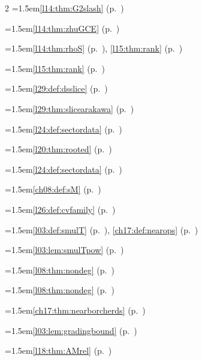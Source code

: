 \begin{multicols}{2}
\hangindent=1.5em\quad \ref{l14:thm:G2slash} (p.~\pageref{l14:thm:G2slash})\par
\hangindent=1.5em\quad \ref{l14:thm:zhuGCE} (p.~\pageref{l14:thm:zhuGCE})\par
\hangindent=1.5em\quad \ref{l14:thm:rhoS} (p.~\pageref{l14:thm:rhoS}), \ref{l15:thm:rank} (p.~\pageref{l15:thm:rank})\par
\hangindent=1.5em\quad \ref{l15:thm:rank} (p.~\pageref{l15:thm:rank})\par
\hangindent=1.5em\quad \ref{l29:def:dsslice} (p.~\pageref{l29:def:dsslice})\par
\hangindent=1.5em\quad \ref{l29:thm:slicearakawa} (p.~\pageref{l29:thm:slicearakawa})\par
\hangindent=1.5em\quad \ref{l24:def:sectordata} (p.~\pageref{l24:def:sectordata})\par
\hangindent=1.5em\quad \ref{l20:thm:rooted} (p.~\pageref{l20:thm:rooted})\par
\hangindent=1.5em\quad \ref{l24:def:sectordata} (p.~\pageref{l24:def:sectordata})\par
\hangindent=1.5em\quad \ref{ch08:def:sM} (p.~\pageref{ch08:def:sM})\par
\hangindent=1.5em\quad \ref{l26:def:cvfamily} (p.~\pageref{l26:def:cvfamily})\par
\hangindent=1.5em\quad \ref{l03:def:smulT} (p.~\pageref{l03:def:smulT}), \ref{ch17:def:nearops} (p.~\pageref{ch17:def:nearops})\par
\hangindent=1.5em\quad \ref{l03:lem:smulTpow} (p.~\pageref{l03:lem:smulTpow})\par
\hangindent=1.5em\quad \ref{l08:thm:nondeg} (p.~\pageref{l08:thm:nondeg})\par
\hangindent=1.5em\quad \ref{l08:thm:nondeg} (p.~\pageref{l08:thm:nondeg})\par
\hangindent=1.5em\quad \ref{ch17:thm:nearborcherds} (p.~\pageref{ch17:thm:nearborcherds})\par
\hangindent=1.5em\quad \ref{l03:lem:gradingbound} (p.~\pageref{l03:lem:gradingbound})\par
\hangindent=1.5em\quad \ref{l18:thm:AMrel} (p.~\pageref{l18:thm:AMrel})\par

\end{multicols}
